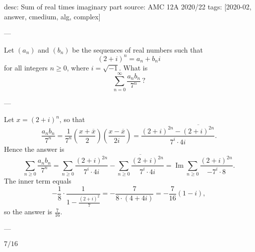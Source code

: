 desc: Sum of real times imaginary part
source: AMC 12A 2020/22
tags: [2020-02, answer, cmedium, alg, complex]

---

Let $(a_n)$ and $(b_n)$ be the sequences of real numbers such that \[(2+i)^n=a_n+b_ni\]
for all integers $n\ge0$, where $i=\sqrt{-1}$. What is \[\sum_{n=0}^\infty\frac{a_nb_n}{7^n}\,?\]

---

Let $x=(2+i)^n$, so that\[\frac{a_nb_n}{7^n}=\frac1{7^n}\left(\frac{x+\overline x}2\right)\left(\frac{x-\overline x}{2i}\right)=\frac{(2+i)^{2n}-\overline{(2+i)^{2n}}}{7^i\cdot4i}.\]
Hence the answer is\[\sum_{n\ge0}\frac{a_nb_n}{7^n}=\sum_{n\ge0}\frac{(2+i)^{2n}}{7^i\cdot4i}-\overline{\sum_{n\ge0}\frac{(2+i)^{2n}}{7^i\cdot4i}}=\operatorname{Im}\sum_{n\ge0}\frac{(2+i)^{2n}}{-7^i\cdot8}.\]
The inner term equals\[-\frac18\cdot\frac1{1-\frac{(2+i)^2}7}=-\frac7{8\cdot(4+4i)}=-\frac7{16}(1-i),\]
so the answer is $\tfrac7{16}$.

---

$7/16$
